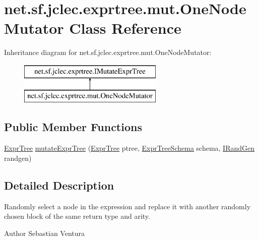 \hypertarget{classnet_1_1sf_1_1jclec_1_1exprtree_1_1mut_1_1_one_node_mutator}{\section{net.\-sf.\-jclec.\-exprtree.\-mut.\-One\-Node\-Mutator Class Reference}
\label{classnet_1_1sf_1_1jclec_1_1exprtree_1_1mut_1_1_one_node_mutator}
}
Inheritance diagram for net.\-sf.\-jclec.\-exprtree.\-mut.\-One\-Node\-Mutator\-:\begin{figure}[H]
\begin{center}
\leavevmode
\includegraphics[height=2.000000cm]{classnet_1_1sf_1_1jclec_1_1exprtree_1_1mut_1_1_one_node_mutator}
\end{center}
\end{figure}
\subsection*{Public Member Functions}
\begin{DoxyCompactItemize}
\item 
\hyperlink{classnet_1_1sf_1_1jclec_1_1exprtree_1_1_expr_tree}{Expr\-Tree} \hyperlink{classnet_1_1sf_1_1jclec_1_1exprtree_1_1mut_1_1_one_node_mutator_aeb40ce09ea13b636b28b35b78b85d5a1}{mutate\-Expr\-Tree} (\hyperlink{classnet_1_1sf_1_1jclec_1_1exprtree_1_1_expr_tree}{Expr\-Tree} ptree, \hyperlink{classnet_1_1sf_1_1jclec_1_1exprtree_1_1_expr_tree_schema}{Expr\-Tree\-Schema} schema, \hyperlink{interfacenet_1_1sf_1_1jclec_1_1util_1_1random_1_1_i_rand_gen}{I\-Rand\-Gen} randgen)
\end{DoxyCompactItemize}


\subsection{Detailed Description}
Randomly select a node in the expression and replace it with another randomly chosen block of the same return type and arity.

\begin{DoxyAuthor}{Author}
Sebastian Ventura 
\end{DoxyAuthor}


